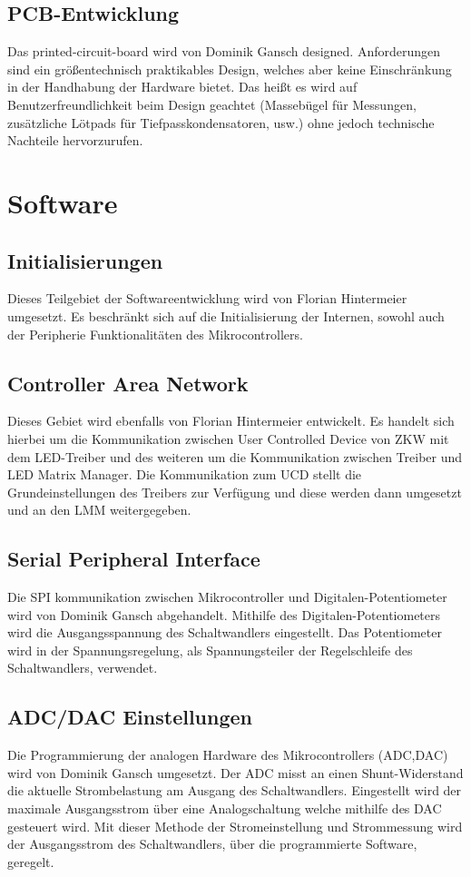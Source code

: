 \documentclass[paper=a4, 12pt]{scrreprt}
\begin{document}
        \subsection{PCB-Entwicklung}\hfill \break
        Das printed-circuit-board wird von Dominik Gansch designed. Anforderungen sind ein größentechnisch praktikables Design, welches aber keine Einschränkung in der Handhabung der Hardware bietet. Das heißt es wird auf Benutzerfreundlichkeit beim Design geachtet (Massebügel für Messungen, zusätzliche Lötpads für Tiefpasskondensatoren, usw.) ohne jedoch technische Nachteile hervorzurufen.
        \newpage
   \section{Software}\hfill \break
   		\subsection{Initialisierungen}\hfill \break
   		Dieses Teilgebiet der Softwareentwicklung wird von Florian Hintermeier umgesetzt. Es beschränkt sich auf die Initialisierung der Internen, sowohl auch der Peripherie Funktionalitäten des Mikrocontrollers.
   		\subsection{Controller Area Network}\hfill \break
   		Dieses Gebiet wird ebenfalls von Florian Hintermeier entwickelt. Es handelt sich hierbei um die Kommunikation zwischen User Controlled Device von ZKW mit dem LED-Treiber und des weiteren um die Kommunikation zwischen Treiber und LED Matrix Manager.
   		Die Kommunikation zum UCD stellt die Grundeinstellungen des Treibers zur Verfügung und diese werden dann umgesetzt und an den LMM weitergegeben.
   		\subsection{Serial Peripheral Interface}\label{SPIInit}\hfill \break
    	Die SPI kommunikation zwischen Mikrocontroller und Digitalen-Potentiometer wird von Dominik Gansch abgehandelt. Mithilfe des Digitalen-Potentiometers wird die Ausgangsspannung des Schaltwandlers eingestellt. Das Potentiometer wird in der Spannungsregelung, als Spannungsteiler der Regelschleife des Schaltwandlers, verwendet.
    	\subsection{ADC/DAC Einstellungen}\hfill \break
    	Die Programmierung der analogen Hardware des Mikrocontrollers (ADC,DAC) wird von Dominik Gansch umgesetzt. Der ADC misst an einen Shunt-Widerstand die aktuelle Strombelastung am Ausgang des Schaltwandlers. Eingestellt wird der maximale Ausgangsstrom über eine Analogschaltung welche mithilfe des DAC gesteuert wird.
    	Mit dieser Methode der Stromeinstellung und Strommessung wird der Ausgangsstrom des Schaltwandlers, über die programmierte Software, geregelt.
\end{document}
